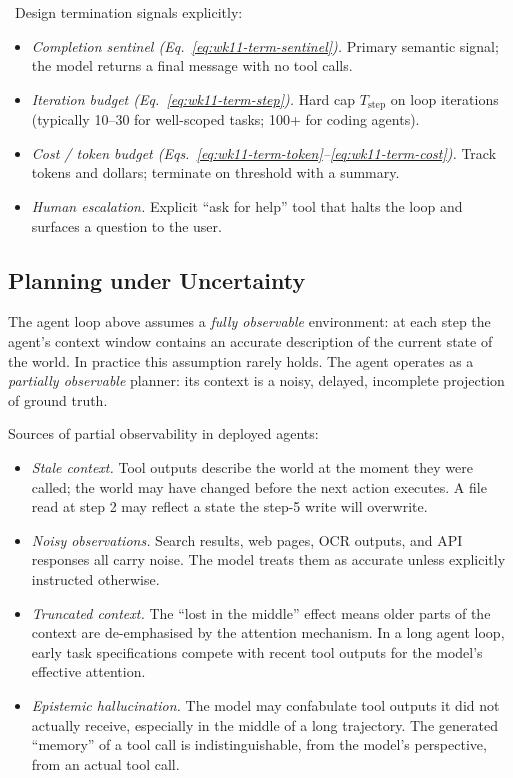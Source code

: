 \Cons\ Design termination signals explicitly:
\begin{itemize}
  \item \emph{Completion sentinel (Eq.~\eqref{eq:wk11-term-sentinel}).}
        Primary semantic signal; the model returns a final message
        with no tool calls.
  \item \emph{Iteration budget (Eq.~\eqref{eq:wk11-term-step}).}
        Hard cap $T_\mathrm{step}$ on loop iterations (typically
        10--30 for well-scoped tasks; 100+ for coding agents).
  \item \emph{Cost / token budget
        (Eqs.~\eqref{eq:wk11-term-token}--\eqref{eq:wk11-term-cost}).}
        Track tokens and dollars; terminate on threshold with a
        summary.
  \item \emph{Human escalation.} Explicit ``ask for help'' tool
        that halts the loop and surfaces a question to the user.
\end{itemize}

\subsection{Planning under Uncertainty}

The agent loop above assumes a \emph{fully observable}
environment: at each step the agent's context window contains an
accurate description of the current state of the world. In
practice this assumption rarely holds. The agent operates as a
\emph{partially observable} planner: its context is a noisy,
delayed, incomplete projection of ground truth.

Sources of partial observability in deployed agents:
\begin{itemize}
  \item \emph{Stale context.} Tool outputs describe the world at
        the moment they were called; the world may have changed
        before the next action executes. A file read at step 2 may
        reflect a state the step-5 write will overwrite.
  \item \emph{Noisy observations.} Search results, web pages,
        OCR outputs, and API responses all carry noise. The model
        treats them as accurate unless explicitly instructed
        otherwise.
  \item \emph{Truncated context.} The ``lost in the middle''
        \citep{liu2024lost} effect means older parts of the context
        are de-emphasised by the attention mechanism. In a long
        agent loop, early task specifications compete with recent
        tool outputs for the model's effective attention.
  \item \emph{Epistemic hallucination.} The model may confabulate
        tool outputs it did not actually receive, especially in
        the middle of a long trajectory. The generated ``memory''
        of a tool call is indistinguishable, from the model's
        perspective, from an actual tool call.
\end{itemize}

